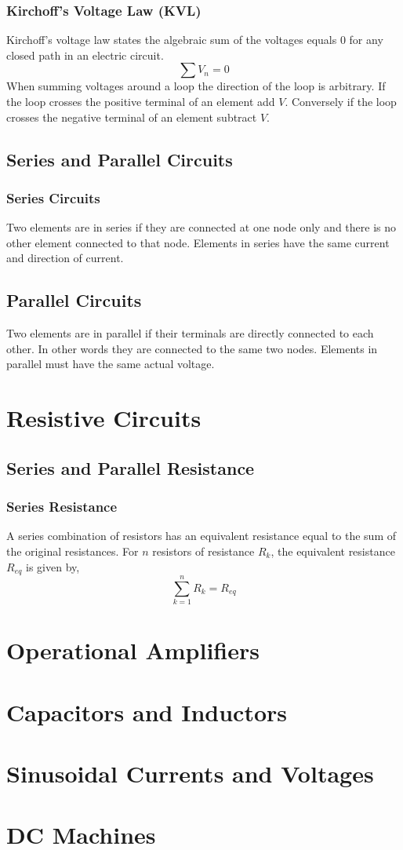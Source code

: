 \documentclass[14pt]{article}
\begin{document}
    \subsubsection{Kirchoff's Voltage Law (KVL)}
    Kirchoff's voltage law states the algebraic sum of the voltages equals 0 for any closed path in an electric circuit.
    $$\sum V_n=0$$
    When summing voltages around a loop the direction of the loop is arbitrary.
    If the loop crosses the positive terminal of an element add $V$. Conversely if the loop crosses the negative terminal of an element subtract $V$.
    \subsection{Series and Parallel Circuits}
    \subsubsection{Series Circuits}
    Two elements are in series if they are connected at one node only and there is no other element connected to that node. Elements in series have the same current and direction of current.
    \subsection{Parallel Circuits}
    Two elements are in parallel if their terminals are directly connected to each other. In other words they are connected to the same two nodes. Elements in parallel must have the same actual voltage.
    \section{Resistive Circuits}
    \subsection{Series and Parallel Resistance}
    \subsubsection{Series Resistance}
    A series combination of resistors has an equivalent resistance equal to the sum of the original resistances. For $n$ resistors of resistance $R_k$, the equivalent resistance $R_{eq}$ is given by,
    $$\sum\limits_{k=1}^nR_k=R_{eq}$$
    \subsubsection{}
    \section{Operational Amplifiers}
    \section{Capacitors and Inductors}
    \section{Sinusoidal Currents and Voltages}
    \section{DC Machines}  
\end{document}
